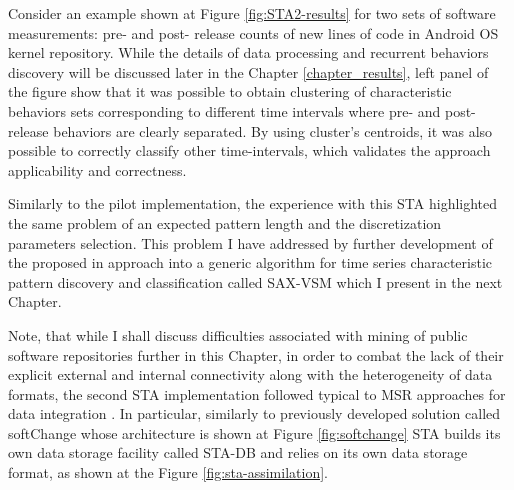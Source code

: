Consider an example shown at Figure \ref{fig:STA2-results} for two sets of software measurements: pre- and post- release 
counts of new lines of code in Android OS kernel repository. While the details of data processing and recurrent behaviors 
discovery will be discussed later in the Chapter \ref{chapter_results}, left panel of the figure show that it was possible to
obtain clustering of characteristic behaviors sets corresponding to different time intervals where pre- and post- release 
behaviors are clearly separated. By using cluster's centroids, it was also possible to correctly classify other time-intervals,
which validates the approach applicability and correctness.

Similarly to the pilot implementation, the experience with this STA highlighted the same problem of an expected pattern 
length and the discretization parameters selection. This problem I have addressed by further development of the proposed 
in \cite{csdl2-11-10} approach into a generic algorithm for time series characteristic pattern discovery and classification 
called SAX-VSM \cite{sax-vsm} which I present in the next Chapter.

Note, that while I shall discuss difficulties associated with mining of public software repositories further in this Chapter, 
in order to combat the lack of their explicit external and internal connectivity along with the heterogeneity of data formats,
the second STA implementation followed typical to MSR approaches for data integration \cite{citeulike:13058334} \cite{cvsanaly}. 
In particular, similarly to previously developed solution called softChange \cite{german04_softchange} whose 
architecture is shown at Figure \ref{fig:softchange} STA builds its own data storage facility called STA-DB and 
relies on its own data storage format, as shown at the Figure \ref{fig:sta-assimilation}.

